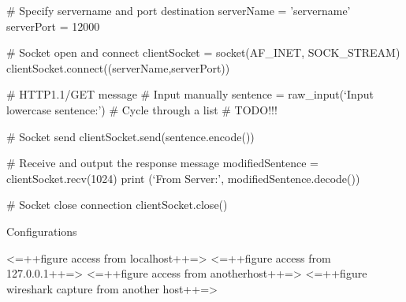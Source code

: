 \documentclass[11pt]{report}
\begin{document}
    # Specify servername and port destination
    serverName = ’servername’
    serverPort = 12000
    
    # Socket open and connect
    clientSocket = socket(AF_INET, SOCK_STREAM)
    clientSocket.connect((serverName,serverPort))
    
    # HTTP1.1/GET message
    #   Input manually
    sentence = raw_input(‘Input lowercase sentence:’)
    #   Cycle through a list
    # TODO!!!
    
    # Socket send
    clientSocket.send(sentence.encode())
    
    # Receive and output the response message
    modifiedSentence = clientSocket.recv(1024)
    print (‘From Server:’, modifiedSentence.decode())
    
    # Socket close connection
    clientSocket.close()

Configurations

<=++figure access from localhost++=>
<=++figure access from 127.0.0.1++=>
<=++figure access from anotherhost++=>
<=++figure wireshark capture from another host++=>
\end{document}
